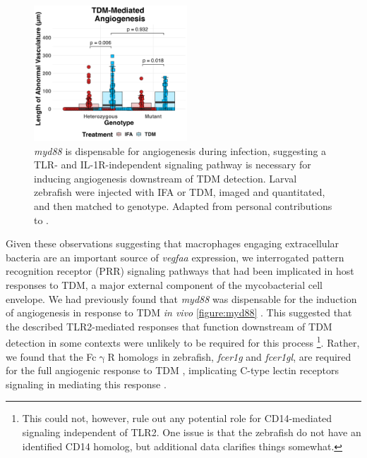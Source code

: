 \begin{figure}
\centering
\includegraphics[height=2in]{images/JB96_myd88_TDM_103022.png}
\caption{\textit{myd88} is dispensable for angiogenesis during infection, suggesting a TLR- and IL-1R-independent signaling pathway is necessary for inducing angiogenesis downstream of TDM detection. Larval zebrafish were injected with IFA or TDM, imaged and quantitated, and then matched to genotype. Adapted from personal contributions to \citet{Walton2018}.}
\label{figure:myd88}

\end{figure}

Given these observations suggesting that macrophages engaging extracellular bacteria are an important source of \textit{vegfaa} expression, we interrogated pattern recognition receptor (PRR) signaling pathways that had been implicated in host responses to TDM, a major external component of the mycobacterial cell envelope. We had previously found that \textit{myd88} was dispensable for the induction of angiogenesis in response to TDM \textit{in vivo }\autoref{figure:myd88} \citep{Bowdish2009, Walton2018}. This suggested that the described TLR2-mediated responses that function downstream of TDM detection in some contexts were unlikely to be required for this process \footnote{This could not, however, rule out any potential role for CD14-mediated signaling independent of TLR2. One issue is that the zebrafish do not have an identified CD14 homolog, but additional data clarifies things somewhat.}. Rather, we found that the Fc$\upgamma$R homologs in zebrafish, \textit{fcer1g} and \textit{fcer1gl}, are required for the full angiogenic response to TDM \citep{Walton2018}, implicating C-type lectin receptors signaling in mediating this response \citep{Richardson2014, Zhao2014}.

